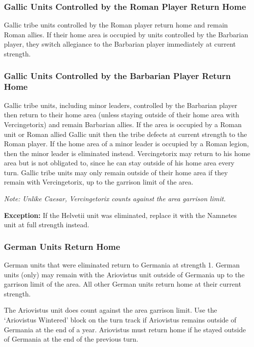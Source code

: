 \subsubsection{Gallic Units Controlled by the Roman Player Return Home}
\par
Gallic tribe units controlled by the Roman player return home and remain Roman allies. If their home area is occupied by units controlled by the Barbarian player, they switch allegiance to the Barbarian player immediately at current strength.

\subsubsection{Gallic Units Controlled by the Barbarian Player Return Home}
\par
Gallic tribe units, including minor leaders, controlled by the Barbarian player then return to their home area (unless staying outside of their home area with Vercingetorix) and remain Barbarian allies. If the area is occupied by a Roman unit or Roman allied Gallic unit then the tribe defects at current strength to the Roman player. If the home area of a minor leader is occupied by a Roman legion, then the minor leader is eliminated instead. Vercingetorix may return to his home area but is not obligated to, since he can stay outside of his home area every turn. Gallic tribe units may only remain outside of their home area if they remain with Vercingetorix, up to the garrison limit of the area.

\textit{Note: Unlike Caesar, Vercingetorix counts against the area garrison limit.}

\textbf{Exception:} If the Helvetii unit was eliminated, replace it with the Namnetes unit at full strength instead.

\subsubsection{German Units Return Home}
\label{german_units_return_home}
\par
German units that were eliminated return to Germania at strength 1. German units (only) may remain with the Ariovistus unit outside of Germania up to the garrison limit of the area. All other German units return home at their current strength.

The Ariovistus unit does count against the area garrison limit. Use the ‘Ariovistus Wintered’ block on the turn track if Ariovistus remains outside of Germania at the end of a year. Ariovistus must return home if he stayed outside of Germania at the end of the previous turn.


